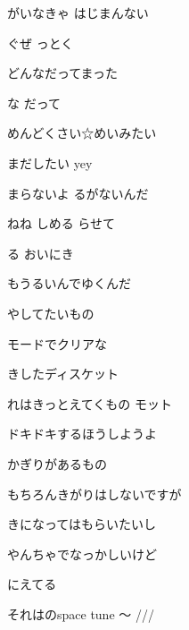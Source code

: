 \documentclass[a4paper,tate,twocolumn,12pt]{ltjtarticle}
\begin{document}
\begin{flushleft}
\vspace{2em}

\noindent\begin{minipage}{\linewidth}
がいなきゃ はじまんない

ぐぜ っとく

どんなだってまった

な だって

めんどくさい☆めいみたい

まだしたい yey

まらないよ るがないんだ
\end{minipage}

\vspace{2em}

\noindent\begin{minipage}{\linewidth}
ねね しめる らせて

 る おいにき

もうるいんでゆくんだ

やしてたいもの

モードでクリアな

きしたディスケット

れはきっとえてくもの モット

ドキドキするほうしようよ

かぎりがあるもの
\end{minipage}

\vspace{2em}

\noindent\begin{minipage}{\linewidth}
もちろんきがりはしないですが

きになってはもらいたいし

やんちゃでなっかしいけど

にえてる

それはのspace tune 〜 ///
\end{minipage}


\end{flushleft}
\end{document}
